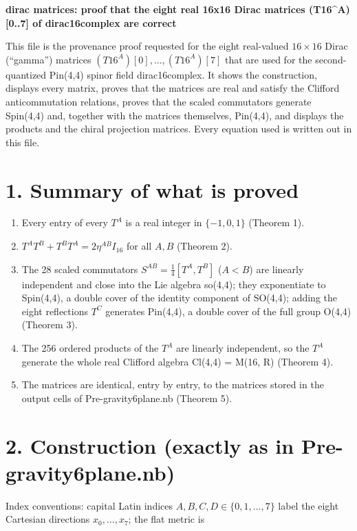 \documentclass[10pt]{article}
\makeatletter
\newcommand\keepnext{\par\nopagebreak\@nobreaktrue\everypar{\@nobreakfalse\everypar{}}}
\makeatother
\begin{document}
{\raggedright\LARGE\bfseries dirac matrices: proof that the eight real 16x16 Dirac matrices (T16\^{}A)[0..7] of dirac16complex are correct\par}\medskip

This file is the provenance proof requested for the eight real-valued $16\times 16$ Dirac (``gamma'') matrices $(T16^A)[0], \dots, (T16^A)[7]$ that are used for the second-quantized Pin(4,4) spinor field dirac16complex. It shows the construction, displays every matrix, proves that the matrices are real and satisfy the Clifford anticommutation relations, proves that the scaled commutators generate Spin(4,4) and, together with the matrices themselves, Pin(4,4), and displays the products and the chiral projection matrices. Every equation used is written out in this file.


\section*{1. Summary of what is proved}

\begin{enumerate}
\item Every entry of every $T^A$ is a real integer in $\{-1,0,1\}$ (Theorem 1).
\item $T^A T^B + T^B T^A = 2\eta^{AB} I_{16}$ for all $A,B$ (Theorem 2).
\item The 28 scaled commutators $S^{AB}=\tfrac14[T^A,T^B]$ ($A<B$) are linearly independent and close into the Lie algebra so(4,4); they exponentiate to Spin(4,4), a double cover of the identity component of SO(4,4); adding the eight reflections $T^C$ generates Pin(4,4), a double cover of the full group O(4,4) (Theorem 3).
\item The 256 ordered products of the $T^A$ are linearly independent, so the $T^A$ generate the whole real Clifford algebra Cl(4,4) = M(16, R) (Theorem 4).
\item The matrices are identical, entry by entry, to the matrices stored in the output cells of Pre-gravity6plane.nb (Theorem 5).
\end{enumerate}


\section*{2. Construction (exactly as in Pre-gravity6plane.nb)}

Index conventions: capital Latin indices $A, B, C, D \in \{0,1,\dots,7\}$ label the eight Cartesian directions $x_0,\dots,x_7$; the flat metric is\keepnext
\end{document}

